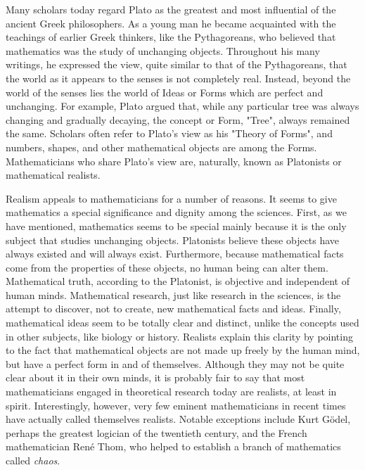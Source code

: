      Many scholars today regard Plato as the greatest and most influential of the ancient Greek philosophers.  As a young man he became acquainted with the teachings of earlier Greek thinkers, like the Pythagoreans, who believed that mathematics was the study of unchanging objects. Throughout his many writings, he expressed the view, quite similar to that of the Pythagoreans, that the world as it appears to the senses is not completely real.  Instead, beyond the world of the senses lies the world of Ideas or Forms which are perfect and unchanging.  For example, Plato argued that, while any particular tree was always changing and gradually decaying, the concept or Form, "Tree", always remained the same.  Scholars often refer to Plato's view as his "Theory of Forms", and numbers, shapes, and other mathematical objects are among the Forms.  Mathematicians who share Plato's view are, naturally, known as Platonists or mathematical realists.
     
    Realism appeals to mathematicians for a number of reasons.  It seems to give mathematics a special significance and dignity among the sciences.  First, as we have mentioned, mathematics seems to be special mainly because it is the only subject that studies unchanging objects.  Platonists believe these objects have always existed and will always exist.  Furthermore, because mathematical facts come from the properties of  these objects, no human being can alter them.  Mathematical truth, according to the Platonist, is objective  and independent of human minds.  Mathematical research, just like research in the sciences, is the attempt to discover, not to create, new mathematical facts and ideas.  Finally, mathematical ideas seem to be totally clear and distinct, unlike the concepts used in other subjects, like biology or history.  Realists explain this clarity by pointing to the fact that mathematical objects are not made up freely by the human mind, but have a perfect form in and of themselves.  Although they may not be quite clear about it in their own minds, it is probably fair to say that most mathematicians engaged in theoretical research today are realists, at least in spirit.  Interestingly, however, very few eminent mathematicians in recent times have actually called themselves realists.  Notable exceptions include Kurt Gödel, perhaps the greatest logician of the twentieth century, and the French mathematician René Thom, who helped to establish a branch of mathematics called \emph{chaos}.  
    
